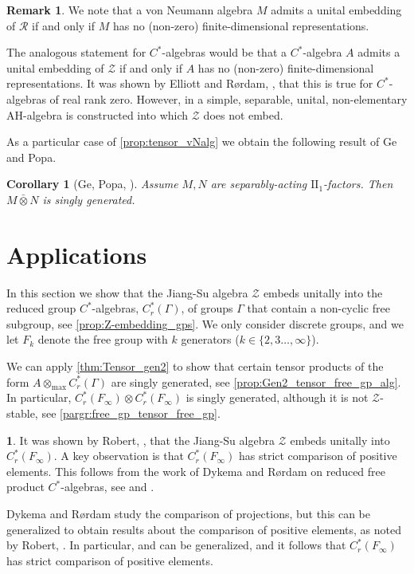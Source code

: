 \documentclass{amsart}
\newtheorem{cor}[corCt]{Corollary}
\theoremstyle{definition}
\newtheorem{pargr}[lma]{}
\newtheorem{rmk}[rmkCt]{Remark}
\begin{document}
\begin{rmk}
    We note that a von Neumann algebra $M$ admits a unital embedding of $\mathcal{R}$ if and only if $M$ has no (non-zero) finite-dimensional representations.

    The analogous statement for {{$C^*$-al\-ge\-bra}}{s} would be that a {{$C^*$-al\-ge\-bra}}{} $A$ admits a unital embedding of $\mathcal{Z}$ if and only if $A$ has no (non-zero) finite-dimensional representations.
    It was shown by Elliott and R{\o}rdam, \cite{EllRor2006}, that this is true for {{$C^*$-al\-ge\-bra}}{s} of real rank zero.
    However, in \cite{DadHirTomWin2009} a simple, separable, unital, non-elementary AH-algebra is constructed into which $\mathcal{Z}$ does not embed.
\end{rmk}

\noindent
    As a particular case of \autoref{prop:tensor_vNalg} we obtain the following result of Ge and Popa.

\begin{cor}[{Ge, Popa, \cite[Theorem 6.2]{GePop1998}}]
\label{prop:GePope}
    Assume $M,N$ are separably-acting $\text{II}_1$-factors.
    Then $M\bar{\otimes}N$ is singly generated.
\end{cor}

\section{Applications}
\label{sect:appl}

\noindent
    In this section we show that the Jiang-Su algebra $\mathcal{Z}$ embeds unitally into the reduced group {{$C^*$-al\-ge\-bra}}{s}, $C^*_r(\Gamma)$, of groups $\Gamma$ that contain a non-cyclic free subgroup, see \autoref{prop:Z-embedding_gps}.
    We only consider discrete groups, and we let $F_k$ denote the free group with $k$ generators ($k\in\{2,3\ldots,\infty\}$).

    We can apply \autoref{thm:Tensor_gen2} to show that certain tensor products of the form $A\otimes_{\text{max}} C^*_r(\Gamma)$ are singly generated, see \autoref{prop:Gen2_tensor_free_gp_alg}.
    In particular, $C^*_r(F_\infty)\otimes C^*_r(F_\infty)$ is singly generated, although it is not $\mathcal{Z}$-stable, see \autoref{pargr:free_gp_tensor_free_gp}.

\begin{pargr}
\label{pargr:Z-embedding_free_gp_alg}
    It was shown by Robert, \cite{Rob2010}, that the Jiang-Su algebra $\mathcal{Z}$ embeds unitally into $C^*_r(F_\infty)$.
    A key observation is that $C^*_r(F_\infty)$ has strict comparison of positive elements.
    This follows from the work of Dykema and R{\o}rdam on reduced free product {{$C^*$-al\-ge\-bra}}{s}, see \cite{DykRor1998b} and \cite{DykRor2000}.

    Dykema and R{\o}rdam study the comparison of projections, but this can be generalized to obtain results about the comparison of positive elements, as noted by Robert, \cite{Rob2010}.
    In particular, \cite[Lemma 5.3]{DykRor1998b} and \cite[Theorem 2.1]{DykRor2000} can be generalized, and it follows that $C^*_r(F_\infty)$ has strict comparison of positive elements.
\end{pargr}
\end{document}
